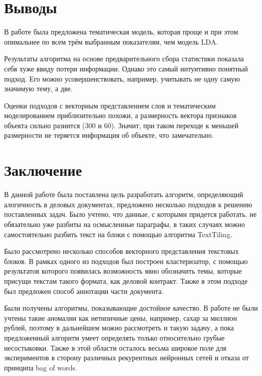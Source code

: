 \documentclass[14pt]{matmex-diploma-custom}
\begin{document}
\newpage

\section*{Выводы}
В работе была предложена тематическая модель, которая проще и при этом опимальнее по всем трём выбранным показателям, чем модель LDA. 

Результаты алгоритма на основе предварительного сбора статистики показала себя хуже ввиду потери информации. Однако это самый интуитивно понятный подход. Его можно усовершенствовать, например, учитывать не одну самую значимую тему, а две.

Оценки подходов с векторным представлением слов и тематическим моделированием приблизительно похожи, а размерность вектора признаков объекта сильно разнится (300 и 60). Значит, при таком переходе к меньшей размерности не теряется информация об объекте, что замечательно.

\newpage
\section*{Заключение}
В данной работе была поставлена цель разработать алгоритм, определяющий алогичность в деловых документах, предложено несколько подходов к решению поставленных задач. Было учтено, что данные, с которыми придется работать, не обязательно уже разбиты на осмысленные параграфы, в таких случаях можно самостоятельно разбить текст на блоки с помощью алгоритма TextTiling. 

Было рассмотрено несколько способов векторного представления текстовых блоков. В рамках одного из подходов был построен кластеризатор, с помощью результатов которого появилась возможность явно обозначить темы, которые присущи текстам такого формата, как деловой контракт. Также в этом подходе был предложен способ аннотации части документа. 

Были получены алгоритмы, показывающие достойное качество. В работе не были учтены такие аномалии как нетипичные цены, например, сахар за миллион рублей, поэтому в дальнейшем можно рассмотреть и такую задачу, а пока предложенный алгоритм умеет определять только относительно грубые несостыковки. Также в этой области осталось весьма широкое поле для экспериментов в сторону различных рекурентных нейронных сетей и отказа от принципа bag of words.
\end{document}
